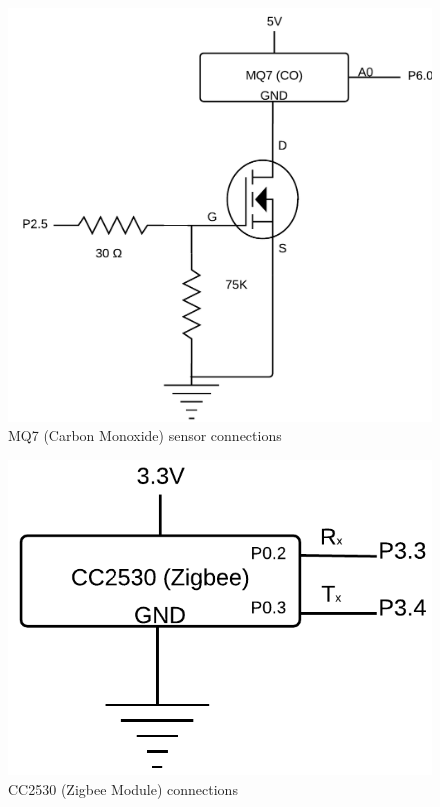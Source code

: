 \documentclass[a4paper,12pt]{article}
\begin{document}
\begin{figure}[!ht]
	\centering
	\includegraphics[scale=0.25]{CO_circuit.png}
	\caption{MQ7 (Carbon Monoxide) sensor connections}
	\label{fig:co_conn}
\end{figure}

\begin{figure}[!ht]
	\centering
	\includegraphics[scale=0.4]{cc2530.png}
	\caption{CC2530 (Zigbee Module) connections}
	\label{fig:cc2530_conn}
\end{figure}
\end{document}
